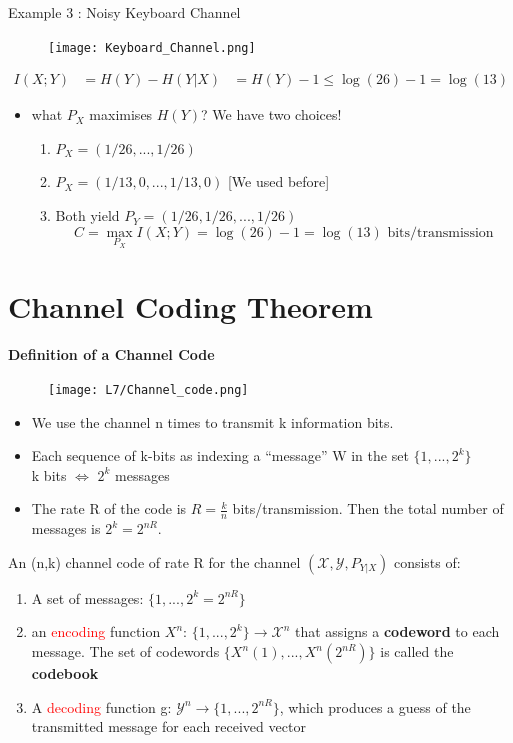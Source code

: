 \documentclass[12pt]{article}
\begin{document}
Example 3 : Noisy Keyboard Channel

\begin{figure}[h]
    \centering
    \texttt{[image: Keyboard\_Channel.png]}
\end{figure}
\begin{align*}
    I(X;Y)& = H(Y)- H(Y|X)
    & = H(Y) - 1 \le \log(26) - 1 = \log(13)
\end{align*}

\begin{itemize}
    \item what $P_X$ maximises $H(Y)$?  We have two choices!
    \begin{enumerate}
        \item $P_X = (1/26,...,1/26)$
        \item $P_X = (1/13,0,...,1/13,0)$ [We used before]
    \item Both yield $P_Y=(1/26,1/26,...,1/26)$
    \[
    C = \max_{P_X}I(X;Y) = \log(26) - 1 = \log(13) \textrm{ bits/transmission}
    \]
    \end{enumerate}
\end{itemize}
\section{Channel Coding Theorem}

{\large \textbf{Definition of a Channel Code}}
\begin{figure}
    \centering
    \texttt{[image: L7/Channel\_code.png]}
\end{figure}
\begin{itemize}
    \item We use the channel n times to transmit k information bits.
    \item Each sequence of k-bits as indexing a ``message'' W in the set $\{1,...,2^k\}$ \\
    k bits $\Leftrightarrow$ $2^k$ messages
    \item The rate R of the code is $R=\frac{k}{n}$ bits/transmission. Then the total number of messages is $2^k = 2^{nR}$.
\end{itemize}
An (n,k) channel code of rate R for the channel $(\mathcal{X}, \mathcal{Y}, P_{Y|X})$ consists of:
\begin{enumerate}
    \item A set of messages: $\{1,...,2^k=2^{nR}\}$
    \item an \textcolor{red}{encoding} function $X^n$: $\{1,...,2^k\} \rightarrow \mathcal{X}^n$ that assigns a \textcolor{blue1}{\textbf{codeword}} to each message. The set of codewords $\{X^n(1),...,X^n(2^{nR})\}$ is called the \textcolor{blue1}{\textbf{codebook}}
    \item A \textcolor{red}{decoding} function g: $\mathcal{Y}^n \rightarrow \{1,...,2^{nR} \}$, which produces a guess of the transmitted message for each received vector
\end{enumerate}
\end{document}
